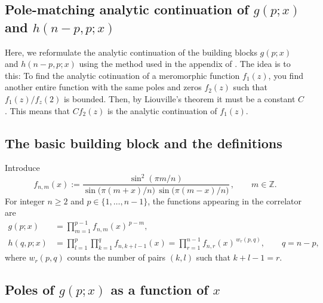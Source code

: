 \documentclass[11pt]{article}
\begin{document}
\subsection{\texorpdfstring{Pole-matching analytic continuation of $g(p;x)$ and $h(n-p,p;x)$}
{Pole-matching analytic continuation of g(p;x) and h(n-p,p;x)}}


  Here, we reformulate the analytic continuation of the building blocks $g(p;x)$
  and $h(n-p,p;x)$ using the method used in the appendix of 
  \cite{Lashkari_2016}.
  The idea is to this: To find the analytic cotinuation of a meromorphic function
  $f_{1}(z)$, you find another entire function with the same poles and zeros
  $f_{2}(z)$ such that $f_{1}(z)/f_{z}(2)$ is bounded. Then, by Liouville's
  theorem it must be a constant $C$. This means that $C f_{2}(z)$ is the analytic
  continuation of $f_{1}(z)$.

  \subsection*{The basic building block and the definitions}

  Introduce
  \begin{equation}
    f_{n,m}(x) :=\frac{\sin^{2}(\pi m/n)}{\sin\!\bigl(\pi(m+x)/n\bigr)\,\sin\!\bigl(\pi(m-x)/n\bigr)}
    \,, \qquad m\in\mathbb{Z}.
  \end{equation}
  For integer $n\ge 2$ and $p\in\{1,\dots,n-1\}$, the functions appearing in the
  correlator are
  \begin{align}
    g(p;x)   & =\prod_{m=1}^{p-1}f_{n,m}(x)^{\,p-m}, \label{eq:g-def-poleapp}                                                                  \\[2pt]
    h(q,p;x) & =\prod_{l=1}^{p}\prod_{k=1}^{q}f_{n,k+l-1}(x) =\prod_{r=1}^{n-1}f_{n,r}(x)^{\,w_r(p,q)}, \qquad q=n-p, \label{eq:h-def-poleapp}
  \end{align}
  where $w_{r}(p,q)$ counts the number of pairs $(k,l)$ such that $k+l-1=r$.

  \subsection*{Poles of $g(p;x)$ as a function of $x$}
\end{document}
